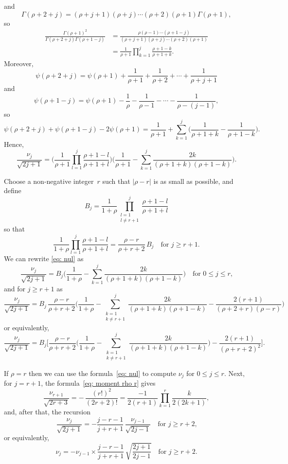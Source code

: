 \documentclass[12pt,a4paper]{article}
\begin{document}
and
\[
\Gamma(\rho+2+j)=(\rho+j+1)(\rho+j)\cdots(\rho+2)(\rho+1)
	\Gamma(\rho+1),
\]
so
\begin{align*}
\frac{\Gamma(\rho+1)^2}{\Gamma(\rho+2+j)\Gamma(\rho+1-j)}
	&=\frac{\rho(\rho-1)\cdots(\rho+1-j)}%
{(\rho+j+1)(\rho+j)\cdots(\rho+2)(\rho+1)}\\
	&=\frac{1}{\rho+1}\prod_{k=1}^j\frac{\rho+1-k}{\rho+1+k}.
\end{align*}
Moreover,
\[
\psi(\rho+2+j)=\psi(\rho+1)+\frac{1}{\rho+1}+\frac{1}{\rho+2}
	+\cdots+\frac{1}{\rho+j+1}
\]
and
\[
\psi(\rho+1-j)=\psi(\rho+1)-\frac{1}{\rho}-\frac{1}{\rho-1}
	-\cdots-\frac{1}{\rho-(j-1)},
\]
so
\[
\psi(\rho+2+j)+\psi(\rho+1-j)-2\psi(\rho+1)
	=\frac{1}{\rho+1}+\sum_{k=1}^j\biggl(\frac{1}{\rho+1+k}
		-\frac{1}{\rho+1-k}\biggr).
\]
Hence,
\begin{equation}\label{eq: nul}
\frac{\nu_j}{\sqrt{2j+1}}=\biggl(\frac{1}{\rho+1}
\prod_{l=1}^j\frac{\rho+1-l}{\rho+1+l}\biggr)
\biggl(\frac{1}{\rho+1}-\sum_{k=1}^j\frac{2k}{(\rho+1+k)(\rho+1-k)}\biggr).
\end{equation}

Choose a non-negative integer~$r$ such that $|\rho-r|$ is as small as 
possible, and define
\[
B_j=\frac{1}{1+\rho}\prod_{\substack{l=1\\ l\ne r+1}}^j\frac{\rho+1-l}{\rho+1+l}
\]
so that
\[
\frac{1}{1+\rho}\prod_{l=1}^j\frac{\rho+1-l}{\rho+1+l}
	=\frac{\rho-r}{\rho+r+2}\,B_j\quad\text{for $j\ge r+1$.}
\]
We can rewrite \eqref{eq: nul} as
\[
\frac{\nu_j}{\sqrt{2j+1}}=B_j\biggl(
	\frac{1}{1+\rho}-\sum_{k=1}^j
	\frac{2k}{(\rho+1+k)(\rho+1-k)}
		\biggr)\quad\text{for $0\le j\le r$,}
\]
and for $j\ge r+1$ as
\[
\frac{\nu_j}{\sqrt{2j+1}}=B_j\,\frac{\rho-r}{\rho+r+2}
	\biggl(\frac{1}{1+\rho}
	-\sum_{\substack{k=1\\ k\ne r+1}}^j
	\frac{2k}{(\rho+1+k)(\rho+1-k)}-\frac{2(r+1)}{(\rho+2+r)(\rho-r)}\biggr)
\]
or equivalently,
\[
\frac{\nu_j}{\sqrt{2j+1}}=B_j\biggl[\frac{\rho-r}{\rho+r+2}
	\biggl(\frac{1}{1+\rho}
	-\sum_{\substack{k=1\\ k\ne r+1}}^j
	\frac{2k}{(\rho+1+k)(\rho+1-k)}\biggr)
-\frac{2(r+1)}{(\rho+r+2)^2}\biggr].
\]


If $\rho=r$ then we can use the formula~\eqref{eq: nul} to compute
$\nu_j$ for $0\le j\le r$.  Next, for $j=r+1$, 
the formula~\eqref{eq: moment rho r} gives
\[
\frac{\nu_{r+1}}{\sqrt{2r+3}}
	=-\,\frac{(r!)^2}{(2r+2)!}=\frac{-1}{2(r+1) }
	\prod_{k=1}^r\frac{k}{2(2k+1)},
\]
and, after that, the recursion
\[
\frac{\nu_j}{\sqrt{2j+1}}=-\frac{j-r-1}{j+r+1}\,
	\frac{\nu_{j-1}}{\sqrt{2j-1}}
	\quad\text{for $j\ge r+2$,}
\]
or equivalently,
\[
\nu_j=-\nu_{j-1}\times\frac{j-r-1}{j+r+1}\,\sqrt{\frac{2j+1}{2j-1}}
	\quad\text{for $j\ge r+2$.}
\]
\end{document}
